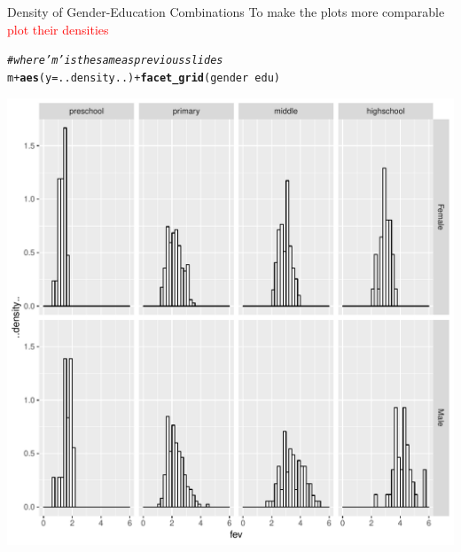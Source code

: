 \documentclass[10pt]{beamer}\usepackage[]{graphicx}\usepackage[]{color}
\makeatletter
\def\maxwidth{ %
  \ifdim\Gin@nat@width>\linewidth
    \linewidth
  \else
    \Gin@nat@width
  \fi
}
\newcommand{\hlcom}[1]{\textcolor[rgb]{0.678,0.584,0.686}{\textit{#1}}}%
\newcommand{\hlopt}[1]{\textcolor[rgb]{0,0,0}{#1}}%
\newcommand{\hlstd}[1]{\textcolor[rgb]{0.345,0.345,0.345}{#1}}%
\newcommand{\hlkwc}[1]{\textcolor[rgb]{0.333,0.667,0.333}{#1}}%
\newcommand{\hlkwd}[1]{\textcolor[rgb]{0.737,0.353,0.396}{\textbf{#1}}}%
\newenvironment{kframe}{%
 \def\at@end@of@kframe{}%
 \ifinner\ifhmode%
  \def\at@end@of@kframe{\end{minipage}}%
  \begin{minipage}{\columnwidth}%
 \fi\fi%
 \def\FrameCommand##1{\hskip\@totalleftmargin \hskip-\fboxsep
 \colorbox{shadecolor}{##1}\hskip-\fboxsep
     \hskip-\linewidth \hskip-\@totalleftmargin \hskip\columnwidth}%
 \MakeFramed {\advance\hsize-\width
   \@totalleftmargin\z@ \linewidth\hsize
   \@setminipage}}%
 {\par\unskip\endMakeFramed%
 \at@end@of@kframe}
\newenvironment{knitrout}{}{} %
\makeatother
\begin{document}
\begin{frame}[fragile]{Density of Gender-Education Combinations}
To make the plots more comparable \textcolor{red}{plot their densities}
\pause
\begin{knitrout}
\color{fgcolor}\begin{kframe}
\begin{alltt}
\hlcom{# where 'm' is the same as previous slides}
\hlstd{m} \hlopt{+} \hlkwd{aes}\hlstd{(}\hlkwc{y} \hlstd{= ..density..)} \hlopt{+} \hlkwd{facet_grid}\hlstd{(gender} \hlopt{~} \hlstd{edu)}
\end{alltt}
\end{kframe}

{\centering \includegraphics[width=\maxwidth,height=.6\linewidth]{figure/unnamed-chunk-10-1} 

}



\end{knitrout}

\end{frame}
\end{document}
